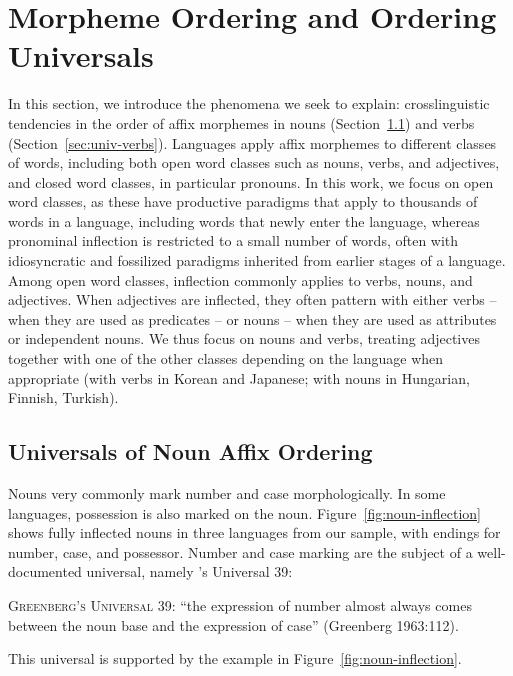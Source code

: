 \documentclass[11pt,letterpaper]{article}
\newcommand{\citet}{\Textcite}
\begin{document}


\section{Morpheme Ordering and Ordering Universals}\label{sec:univ}


In this section, we introduce the phenomena we seek to explain: crosslinguistic tendencies in the order of affix morphemes in nouns (Section~\ref{sec:univ-nouns}) and verbs (Section~\ref{sec:univ-verbs}).
Languages apply affix morphemes to different classes of words, including both open word classes such as nouns, verbs, and adjectives, and closed word classes, in particular pronouns.
In this work, we focus on open word classes, as these have productive paradigms that apply to thousands of words in a language, including words that newly enter the language, whereas pronominal inflection is restricted to a small number of words, often with idiosyncratic and fossilized paradigms inherited from earlier stages of a language.
Among open word classes, inflection commonly applies to verbs, nouns, and adjectives.
When adjectives are inflected, they often pattern with either verbs -- when they are used as predicates -- or nouns -- when they are used as attributes or independent nouns.
We thus focus on nouns and verbs, treating adjectives together with one of the other classes depending on the language when appropriate (with verbs in Korean and Japanese; with nouns in Hungarian, Finnish, Turkish).

\subsection{Universals of Noun Affix Ordering}\label{sec:univ-nouns}
Nouns very commonly mark number and case morphologically.
In some languages, possession is also marked on the noun.
Figure~\ref{fig:noun-inflection} shows fully inflected nouns in three languages from our sample, with endings for number, case, and possessor.
Number and case marking are the subject of a well-documented universal, namely \citet{greenberg1963universals}'s Universal 39:

\begin{adjustwidth}{6em}{6em}
\textsc{Greenberg's Universal 39}:
``the expression of number almost always comes between the noun base and the expression of case'' (Greenberg 1963:112).
\end{adjustwidth}
This universal is supported by the example in Figure~\ref{fig:noun-inflection}.
\end{document}
